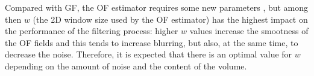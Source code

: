 \documentclass{article}
\begin{document}

Compared with GF, the OF estimator requires some new parameters
\cite{farneback2003two}, but among then $w$ (the 2D window size used
by the OF estimator) has the highest impact on the performance of the
filtering process: higher $w$ values increase the smootness of the OF
fields and this tends to increase blurring, but also, at the same
time, to decrease the noise. Therefore, it is expected that there is
an optimal value for $w$ depending on the amount of noise and the
content of the volume.
\end{document}

